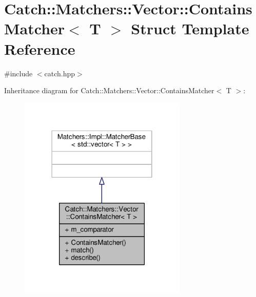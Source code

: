 \hypertarget{struct_catch_1_1_matchers_1_1_vector_1_1_contains_matcher}{\section{Catch\-:\-:Matchers\-:\-:Vector\-:\-:Contains\-Matcher$<$ T $>$ Struct Template Reference}
\label{struct_catch_1_1_matchers_1_1_vector_1_1_contains_matcher}
}


{\ttfamily \#include $<$catch.\-hpp$>$}



Inheritance diagram for Catch\-:\-:Matchers\-:\-:Vector\-:\-:Contains\-Matcher$<$ T $>$\-:
\nopagebreak
\begin{figure}[H]
\begin{center}
\leavevmode
\includegraphics[width=226pt]{struct_catch_1_1_matchers_1_1_vector_1_1_contains_matcher__inherit__graph}
\end{center}
\end{figure}


